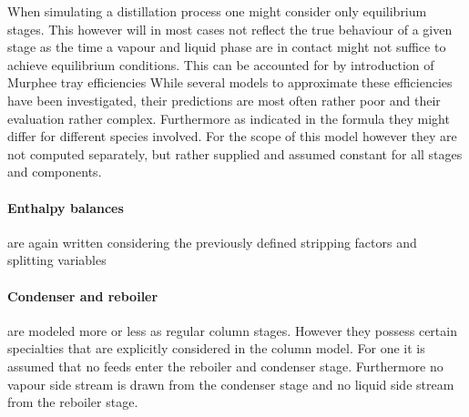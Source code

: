         When simulating a distillation process one might consider only equilibrium stages. This however
        will in most cases not reflect the true behaviour of a given stage as the time a vapour and
        liquid phase are in contact might not suffice to achieve equilibrium conditions. This can be 
        accounted for by introduction of Murphee tray efficiencies \cite{Henley.op.2011}
        While several models to approximate these efficiencies have been investigated, their predictions are
        most often rather poor \cite{Coulson.1999} and their evaluation rather complex. Furthermore as indicated
        in the formula they might differ for different species involved. For the scope of this model however
        they are not computed separately, but rather supplied and assumed constant for all stages and components.

        \paragraph{Enthalpy balances} are again written considering the previously defined stripping factors
        and splitting variables
        \paragraph{Condenser and reboiler} are modeled more or less as regular column stages. However they possess
        certain specialties that are explicitly considered in the column model. For one it is assumed
        that no feeds enter the reboiler and condenser stage. Furthermore no vapour side stream is
        drawn from the condenser stage and no liquid side stream from the reboiler stage.

